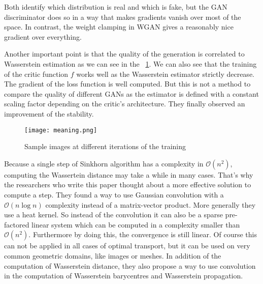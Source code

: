 Both identify which distribution is real and which is fake, but the GAN discriminator does so in a way that makes gradients vanish over most of the space. In contrast, the weight clamping in WGAN gives a reasonably nice gradient over everything.

Another important point is that the quality of the generation is correlated to Wasserstein estimation as we can see in the \figurename~\ref{meaning}. We  can also see that the training of the critic function $f$ works well as the Wasserstein estimator strictly decrease. The gradient of the loss function is well computed. But this is not a method to compare the quality of different GANs as the estimator is defined with a constant scaling factor depending on the critic's architecture. They finally observed an improvement of the stability. 

\begin{figure}
	\centering
	\texttt{[image: meaning.png]}
	\caption{Sample images at different iterations of the training}
	\label{meaning}
\end{figure}


Because a single step of Sinkhorn algorithm has a complexity in $\mathcal{O}(n^2)$, computing the Wassertein distance may take a while in many cases. That's why the researchers who write this paper thought about a more effective solution to compute a step. They found a way to use Gaussian convolution with a $\mathcal{O}(n \log n)$ complexity instead of a matrix-vector product. More generally they use a heat kernel. So instead of the convolution it can also be a sparse pre-factored linear system which can be computed in a complexity smaller than $\mathcal{O}(n^2)$. Furthermore by doing this, the convergence is still linear. Of course this can not be applied in all cases of optimal transport, but it can be used on very common geometric domains, like images or meshes. In addition of the computation of Wasserstein distance, they also propose a way to use convolution in the computation of Wasserstein barycentres and Wasserstein propagation.

